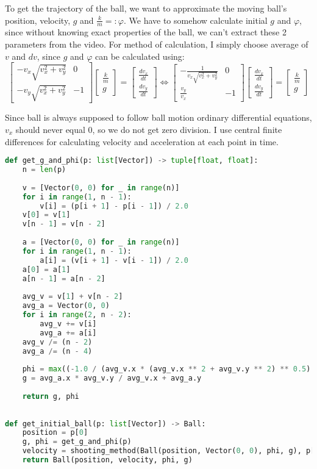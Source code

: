 \documentclass{article}
\begin{document}
	To get the trajectory of the ball, we want to approximate the moving ball's position, velocity, $g$ and $\frac{k}{m} =: \varphi$. We have to somehow calculate initial $g$ and $\varphi$, since without knowing exact properties of the ball, we can't extract these 2 parameters from the video. For method of calculation, I simply choose average of $v$ and $dv$, since $g$ and $\varphi$ can be calculated using:
	$$\begin{bmatrix} -v_x \sqrt{v_x^2 + v_y^2} & 0 \\ -v_y \sqrt{v_x^2 + v_y^2} & -1 \end{bmatrix} \begin{bmatrix} \frac{k}{m} \\ g \end{bmatrix} = \begin{bmatrix} \frac{dv_x}{dt} \\ \frac{dv_y}{dt} \end{bmatrix} \Leftrightarrow \begin{bmatrix} -\frac{1}{v_x \sqrt{v_x^2 + v_y^2}} & 0 \\ \frac{v_y}{v_x} & -1 \end{bmatrix} \begin{bmatrix} \frac{dv_x}{dt} \\ \frac{dv_y}{dt} \end{bmatrix} = \begin{bmatrix} \frac{k}{m} \\ g \end{bmatrix}$$
	
	Since ball is always supposed to follow ball motion ordinary differential equations, $v_x$ should never equal $0$, so we do not get zero division. I use central finite differences for calculating velocity and acceleration at each point in time. \\
	
	\begin{lstlisting}[language=python]
def get_g_and_phi(p: list[Vector]) -> tuple[float, float]:
	n = len(p)
	
	v = [Vector(0, 0) for _ in range(n)]
	for i in range(1, n - 1):
		v[i] = (p[i + 1] - p[i - 1]) / 2.0
	v[0] = v[1]
	v[n - 1] = v[n - 2]
	
	a = [Vector(0, 0) for _ in range(n)]
	for i in range(1, n - 1):
		a[i] = (v[i + 1] - v[i - 1]) / 2.0
	a[0] = a[1]
	a[n - 1] = a[n - 2]
	
	avg_v = v[1] + v[n - 2]
	avg_a = Vector(0, 0)
	for i in range(2, n - 2):
		avg_v += v[i]
		avg_a += a[i]
	avg_v /= (n - 2)
	avg_a /= (n - 4)
	
	phi = max((-1.0 / (avg_v.x * (avg_v.x ** 2 + avg_v.y ** 2) ** 0.5) * avg_a.x), 0.0)
	g = avg_a.x * avg_v.y / avg_v.x + avg_a.y
	
	return g, phi
	
	
def get_initial_ball(p: list[Vector]) -> Ball:
	position = p[0]
	g, phi = get_g_and_phi(p)
	velocity = shooting_method(Ball(position, Vector(0, 0), phi, g), p[-1], 1, len(p) - 1)
	return Ball(position, velocity, phi, g)\end{lstlisting}
\end{document}
